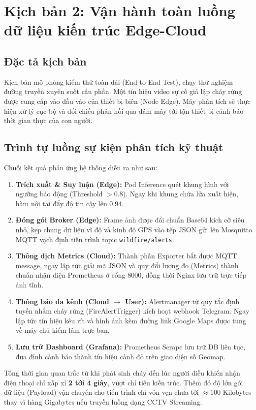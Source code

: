 \documentclass[12pt,a4paper]{report}
\begin{document}
\section{Kịch bản 2: Vận hành toàn luồng dữ liệu kiến trúc Edge-Cloud}

\subsection{Đặc tả kịch bản}
Kịch bản mô phỏng kiểm thử toàn dải (End-to-End Test), chạy thử nghiệm đường truyền xuyên suốt cấu phần. Một tín hiệu video sự cố giả lập cháy rừng được cung cấp vào đầu vào của thiết bị biên (Node Edge). Máy phân tích sẽ thực hiện xử lý cục bộ và đối chiếu phản hồi qua đám mây tới tận thiết bị cảnh báo thời gian thực của con người.

\subsection{Trình tự luồng sự kiện phân tích kỹ thuật}

Chuỗi kết quả phản ứng hệ thống diễn ra như sau:
\begin{enumerate}
    \item \textbf{Trích xuất \& Suy luận (Edge):} Pod Inference quét khung hình với ngưỡng báo động (Threshold $> 0.8$). Ngay khi khung chứa lửa xuất hiện, hàm nội tại đẩy độ tin cậy lên 0.94.
    \item \textbf{Đóng gói Broker (Edge):} Frame ảnh được đổi chuẩn Base64 kích cỡ siêu nhỏ, kẹp chung dữ liệu vĩ độ và kinh độ GPS vào tệp JSON gửi lên Mosquitto MQTT vạch định tiến trình topic \texttt{wildfire/alerts}.
    \item \textbf{Thông dịch Metrics (Cloud):} Thành phần Exporter bắt được MQTT message, ngay lập tức giải mã JSON và quy đổi lượng đo (Metrics) thành chuẩn nhận diện Prometheus ở cổng 8000, đồng thời Nginx lưu trữ trực tiếp ảnh tĩnh.
    \item \textbf{Thông báo đa kênh (Cloud $\rightarrow$ User):} Alertmanager từ quy tắc định tuyến nhắm cháy rừng (FireAlertTrigger) kích hoạt webhook Telegram. Ngay lập tức tín hiệu kêu rít và hình ảnh kèm đường link Google Maps được tung về máy chủ kiểm lâm trực ban.
    \item \textbf{Lưu trữ Dashboard (Grafana):} Prometheus Scrape lưu trữ DB liên tục, đưa đỉnh cảnh báo thành tín hiệu cảnh đỏ trên giao diện số Geomap.
\end{enumerate}

Tổng thời gian quan trắc từ khi phát sinh cháy đến lúc người điều khiển nhận điện thoại chỉ xấp xỉ \textbf{2 tới 4 giây}, vượt chỉ tiêu kiến trúc. Thêm đó độ lớn gói dữ liệu (Payload) vận chuyển cho tiến trình chỉ vỏn vẹn chưa tới $\approx 100$ Kilobytes thay vì hàng Gigabytes nếu truyền luồng dạng CCTV Streaming.
\end{document}
